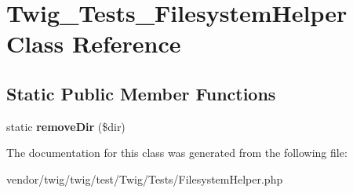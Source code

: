 \hypertarget{classTwig__Tests__FilesystemHelper}{}\section{Twig\+\_\+\+Tests\+\_\+\+Filesystem\+Helper Class Reference}
\label{classTwig__Tests__FilesystemHelper}
\subsection*{Static Public Member Functions}
\begin{DoxyCompactItemize}
\item 
static {\bfseries remove\+Dir} (\$dir)\hypertarget{classTwig__Tests__FilesystemHelper_a08e2ec9241d98dc8d0bd17f38535e165}{}\label{classTwig__Tests__FilesystemHelper_a08e2ec9241d98dc8d0bd17f38535e165}

\end{DoxyCompactItemize}


The documentation for this class was generated from the following file\+:\begin{DoxyCompactItemize}
\item 
vendor/twig/twig/test/\+Twig/\+Tests/Filesystem\+Helper.\+php\end{DoxyCompactItemize}
